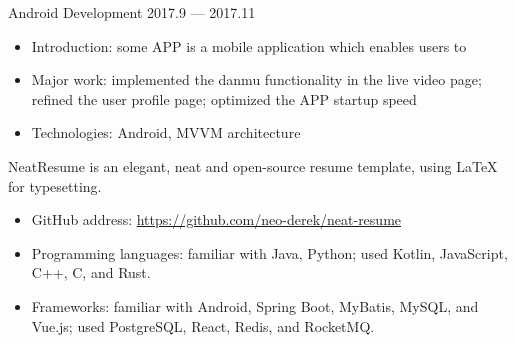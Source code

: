 \documentclass[10pt, a4paper]{article}
\begin{document}
    \mydelimiter
    
    
    
    Android Development \hfill 2017.9 --- 2017.11
    
    \begin{itemize}[leftmargin=*, topsep=0pt]
        \item Introduction: some APP is a mobile application which enables users to 
        \item Major work: implemented the danmu functionality in the live video page; refined the user profile page; optimized the APP startup speed
        \item Technologies: Android, MVVM architecture
    \end{itemize}
    
    \mydelimiter
    
    
    NeatResume is an elegant, neat and open-source resume template, using \LaTeX{} for typesetting.
    
    \begin{itemize}[leftmargin=*, topsep=0pt]
        \item GitHub address: \href{https://github.com/neo-derek/neat-resume}{\courierprime\fontsize{10}{12}\selectfont https://github.com/neo-derek/neat-resume}
    \end{itemize}
    
    \mydelimiter
    
    
    \begin{itemize}[leftmargin=*, topsep=0pt]
        \item Programming languages: familiar with Java, Python; used Kotlin, JavaScript, C++, C, and Rust.
        \item Frameworks: familiar with Android, Spring Boot, MyBatis, MySQL, and Vue.js; used PostgreSQL, React, Redis, and RocketMQ.
    \end{itemize}
    
    
\end{document}
